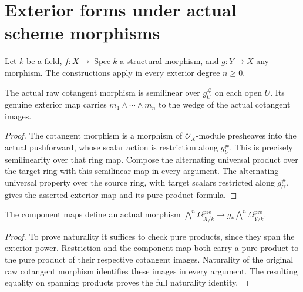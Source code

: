 \section{Exterior forms under actual scheme morphisms}

Let $k$ be a field, $f:X\to\operatorname{Spec}k$ a structural morphism, and $g:Y\to X$ any morphism. The constructions apply in every exterior degree $n\geq0$.

\begin{definition}\label{sc0-exterior-cotangent-morphism:coefficients}
\leanok
{}
The actual raw cotangent morphism is semilinear over $g^\#_U$ on each open $U$. Its genuine exterior map carries $m_1\wedge\cdots\wedge m_n$ to the wedge of the actual cotangent images.
\end{definition}
\begin{proof}
The cotangent morphism is a morphism of $\mathcal O_X$-module presheaves into the actual pushforward, whose scalar action is restriction along $g^\#_U$. This is precisely semilinearity over that ring map. Compose the alternating universal product over the target ring with this semilinear map in every argument. The alternating universal property over the source ring, with target scalars restricted along $g^\#_U$, gives the asserted exterior map and its pure-product formula.
\end{proof}

\begin{definition}\label{sc0-exterior-cotangent-morphism:raw}
\leanok
{}
The component maps define an actual morphism $\bigwedge^n\Omega^{\mathrm{pre}}_{X/k}\to g_*\bigwedge^n\Omega^{\mathrm{pre}}_{Y/k}$.
\end{definition}
\begin{proof}
To prove naturality it suffices to check pure products, since they span the exterior power. Restriction and the component map both carry a pure product to the pure product of their respective cotangent images. Naturality of the original raw cotangent morphism identifies these images in every argument. The resulting equality on spanning products proves the full naturality identity.
\end{proof}

